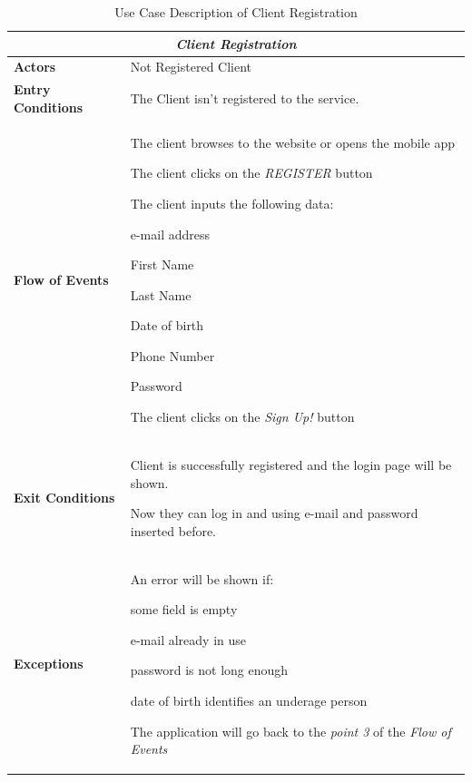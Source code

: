 \documentclass[a4paper]{article}
\begin{document}
\begin{enumerate}[label=\bfseries G\arabic*:]
\begin{table} [H]
\begin{center}
\begin{tabular}{ |m{}|m{}|  }
\hline
    \multicolumn{2}{|c|}{\textbf{\textit{Client Registration}}} \\
\hline \hline
    \textbf{Actors}
&   Not Registered Client
\\ \hline
    \textbf{Entry Conditions}
&   The Client isn't registered to the service.
\\ \hline
    \textbf{Flow of Events}
& 
    \begin{enumerate*}
    \item The client browses to the website or opens the mobile app
    \item The client clicks on the \emph{REGISTER} button
    \item The client inputs the following data:
        \begin{enumerate*}
        \item e-mail address
        \item First Name
        \item Last Name
        \item Date of birth
        \item Phone Number
        \item Password
        \end{enumerate*}
    \item The client clicks on the \emph{Sign Up!} button
    \end{enumerate*}
\\ \hline
    \textbf{Exit Conditions}
&   Client is successfully registered and the login page will be shown. 

    Now they can log in and using e-mail and password inserted before.
\\ \hline
    \textbf{Exceptions}
&   
    An error will be shown if:
    \begin{itemize*}
    \item some field is empty
    \item e-mail already in use
    \item password is not long enough
    \item date of birth identifies an underage person
    \end{itemize*}
    The application will go back to the \emph{point 3} of the \emph{Flow of Events}
\\ \hline
\end{tabular}
\end{center}
\caption{Use Case Description of Client Registration}
\label{table:clientregistration}
\end{table}



\end{enumerate}
\end{document}
